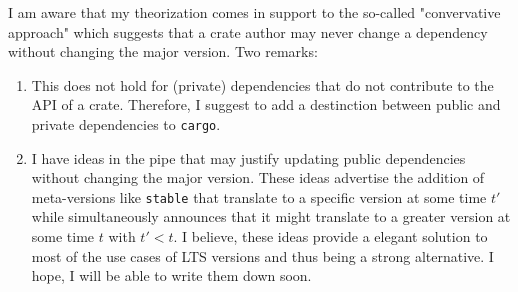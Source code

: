 \documentclass{article}
\begin{document}
    I am aware that my theorization comes in support to the so-called "convervative approach" which suggests that a crate author may never change a dependency without changing the major version. Two remarks:
    \begin{enumerate}
        \item This does not hold for (private) dependencies that do not contribute to the API of a crate. Therefore, I suggest to add a destinction between public and private dependencies to \texttt{cargo}.
        \item I have ideas in the pipe that may justify updating public dependencies without changing the major version. These ideas advertise the addition of meta-versions like \texttt{stable} that translate to a specific version at some time $t'$ while simultaneously announces that it might translate to a greater version at some time $t$ with $t' < t$. I believe, these ideas provide a elegant solution to most of the use cases of LTS versions and thus being a strong alternative. I hope, I will be able to write them down soon.
    \end{enumerate}

    
    
\end{document}
